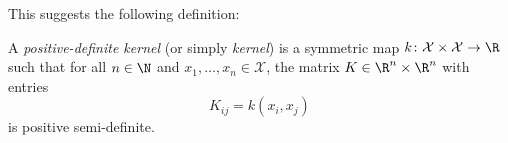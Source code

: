 \documentclass[a4paper]{article}
\begin{document}
%
%
%
%
%

This suggests the following definition:
\begin{defi}
  A \emph{positive-definite kernel} (or simply \emph{kernel}) is a symmetric map $k\colon \mathcal{X} \times \mathcal{X} \to \R$ such that for all $n \in \N$ and $x_1, \ldots, x_n \in \mathcal{X}$, the matrix $K \in \R^n \times \R^n$ with entries
  \[
    K_{ij} = k(x_i, x_j)
  \]
  is positive semi-definite.
\end{defi}

%
%
%
\end{document}
